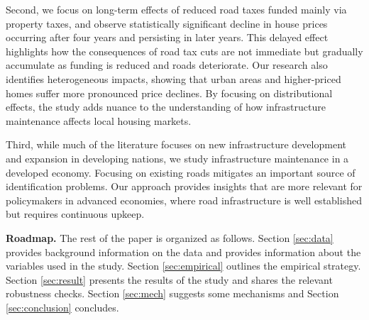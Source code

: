 Second, we focus on long-term effects of reduced road taxes funded mainly via property taxes, and observe statistically significant decline in house prices occurring after four years and persisting in later years. This delayed effect highlights how the consequences of road tax cuts are not immediate but gradually accumulate as funding is reduced and roads deteriorate. Our research also identifies heterogeneous impacts, showing that urban areas and higher-priced homes suffer more pronounced price declines. By focusing on distributional effects, the study adds nuance to the understanding of how infrastructure maintenance affects local housing markets.

Third, while much of the literature focuses on new infrastructure development and expansion in developing nations, we study infrastructure maintenance in a developed economy.  Focusing on existing roads mitigates an important source of identification problems.   Our approach provides insights that are more relevant for policymakers in advanced economies, where road infrastructure is well established but requires continuous upkeep. 

{\bf Roadmap.} The rest of the paper is organized as follows. Section \ref{sec:data} provides background information on the data and provides information about the variables used in the study. Section \ref{sec:empirical} outlines the empirical strategy. Section \ref{sec:result} presents the results of the study and shares the relevant robustness checks. Section \ref{sec:mech} suggests some mechanisms and Section \ref{sec:conclusion} concludes. 